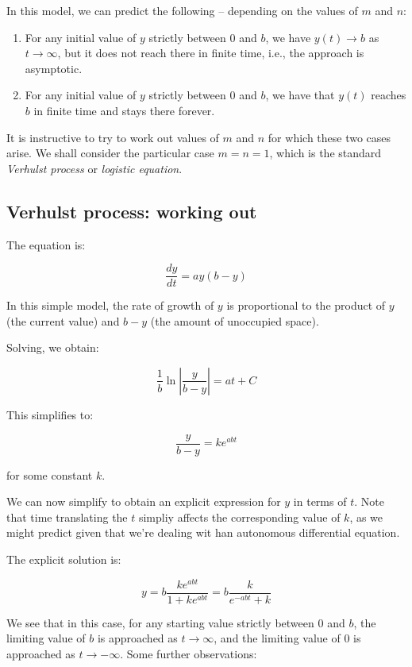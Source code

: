 \documentclass{amsart}
\begin{document}
In this model, we can predict the following -- depending on the values
of $m$ and $n$:

\begin{enumerate}
\item For any initial value of $y$ strictly between $0$ and $b$, we
  have $y(t) \to b$ as $t \to \infty$, but it does not reach
  there in finite time, i.e., the approach is asymptotic.
\item For any initial value of $y$ strictly between $0$ and $b$, we
  have that $y(t)$ reaches $b$ in finite time and stays there forever.
\end{enumerate}

It is instructive to try to work out values of $m$ and $n$ for which
these two cases arise. We shall consider the particular case $m = n =
1$, which is the standard {\em Verhulst process} or {\em logistic equation}.

\subsection{Verhulst process: working out}

The equation is:

$$\frac{dy}{dt} = ay(b - y)$$

In this simple model, the rate of growth of $y$ is proportional to the
product of $y$ (the current value) and $b - y$ (the amount of
unoccupied space). 

Solving, we obtain:

$$\frac{1}{b} \ln\left|\frac{y}{b - y} \right| = at + C$$

This simplifies to:

$$\frac{y}{b - y} = ke^{abt}$$

for some constant $k$.

We can now simplify to obtain an explicit expression for $y$ in terms
of $t$. Note that time translating the $t$ simpliy affects the
corresponding value of $k$, as we might predict given that we're
dealing wit han autonomous differential equation.

The explicit solution is:

$$y = b \frac{ke^{abt}}{1 + ke^{abt}} = b \frac{k}{e^{-abt} + k}$$

We see that in this case, for any starting value strictly between $0$
and $b$, the limiting value of $b$ is approached as $t \to \infty$,
and the limiting value of $0$ is approached as $t \to -\infty$. Some further observations:
\end{document}
